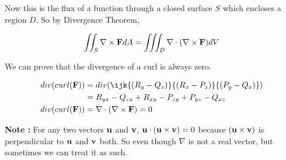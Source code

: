 Now this is the flux of a function through a closed surface $S$ which encloses a region $D$.
So by Divergence Theorem,

$$ \iint_S \nabla \times {\bf F} dA = \iiint_D \nabla \cdot (\nabla \times {\bf F}) dV $$

We can prove that the divergence of a curl is always zero.

\begin{align*}
div( curl({\bf F}) ) 
    & = div(\ijk{(R_y - Q_z)}{(R_x - P_z)}{(P_y - Q_x)}) \\
    & = R_{yx} - Q_{zx} + R_{xy} - P_{zy} + P_{yz} - Q_{xz} \\
div( curl( {\bf F} )) & = \nabla \cdot (\nabla \times {\bf F}) = 0
\end{align*} 

{\bf Note : } For any two vectors ${\bf u}$ and  ${\bf v}$, ${\bf u} \cdot ({\bf u} \times {\bf v}) = 0$ 
because $({\bf u} \times {\bf v})$ is perpendicular to ${\bf u}$ and ${\bf v}$ both.
So even though $\nabla$ is not a real vector, but sometimes we can treat it as such.


